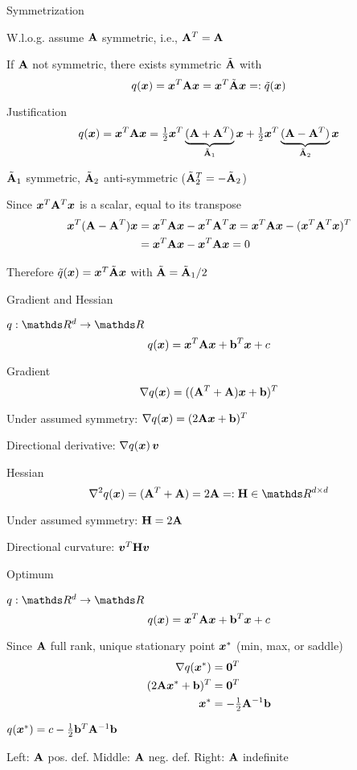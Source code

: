 \documentclass[11pt,compress,t,notes=noshow, xcolor=table]{beamer}
\begin{document}
\begin{framei}{Symmetrization}
\item W.l.o.g. assume $\mathbf{A}$ symmetric, i.e., $\mathbf{A}^T = \mathbf{A}$
\item If $\mathbf{A}$ not symmetric, there exists symmetric $\tilde {\mathbf{A}}$ with $$ q(\bm{x}) = \bm{x}^T \mathbf{A} \bm{x} = \bm{x}^T \tilde {\mathbf{A}} \bm{x} =: \tilde q(\bm{x}) $$
\item Justification
$$ q(\bm{x}) = \bm{x}^T \mathbf{A} \bm{x} = \tfrac12 \bm{x}^T \underbrace{(\mathbf{A} + \mathbf{A}^T)}_{\tilde {\mathbf{A}}_1} \bm{x} + \tfrac12 \bm{x}^T \underbrace{(\mathbf{A} - \mathbf{A}^T)}_{\tilde {\mathbf{A}}_2} \bm{x} $$
\item $\tilde {\mathbf{A}}_1$ symmetric, $\tilde {\mathbf{A}}_2$ anti-symmetric ($\tilde {\mathbf{A}}_2^T = - \tilde {\mathbf{A}}_2$)
\item Since $\bm{x}^T \mathbf{A}^T \bm{x}$ is a scalar, equal to its transpose
\begin{align*}
\bm{x}^T (\mathbf{A} - \mathbf{A}^T) \bm{x} &= \bm{x}^T \mathbf{A} \bm{x} - \bm{x}^T \mathbf{A}^T \bm{x} = \bm{x}^T \mathbf{A} \bm{x} - (\bm{x}^T \mathbf{A}^T \bm{x})^T \\
                      &= \bm{x}^T \mathbf{A} \bm{x} - \bm{x}^T \mathbf{A} \bm{x} = 0
\end{align*}
\item Therefore $\tilde q(\bm{x}) = \bm{x}^T \tilde {\mathbf{A}} \bm{x}$ with $\tilde {\mathbf{A}} = \tilde {\mathbf{A}}_1/2$
\end{framei}

\begin{framei}{Gradient and Hessian}
\item $q: \R^d \to \R$
$$ q(\bm{x}) = \bm{x}^T \mathbf{A} \bm{x} + \mathbf{b}^T \bm{x} + c $$
\item Gradient
$$ \nabla q(\bm{x}) = ((\mathbf{A}^T + \mathbf{A}) \bm{x} + \mathbf{b})^T $$
\item Under assumed symmetry: $\nabla q(\bm{x}) = (2 \mathbf{A} \bm{x} + \mathbf{b})^T$
\item Directional derivative: $\nabla q(\bm{x})\, \bm{v} $
\item Hessian
$$ \nabla^2 q(\xv) = (\A^T + \A) = 2 \A =: \H \in \R^{d \times d} $$
\item Under assumed symmetry: $\mathbf{H} = 2 \mathbf{A}$
\item Directional curvature: $\bm{v}^T \mathbf{H} \bm{v} $
\end{framei}


\begin{framei}{Optimum}
\item $q: \R^d \to \R$
$$ q(\bm{x}) = \bm{x}^T \mathbf{A} \bm{x} + \mathbf{b}^T \bm{x} + c $$
\item Since $\mathbf{A}$ full rank, unique stationary point $\bm{x}^\ast$ (min, max, or saddle)
\begin{align*}
\nabla q(\bm{x}^\ast)      &= \boldsymbol{0}^T \\
(2 \mathbf{A} \bm{x}^\ast + \mathbf{b})^T &= \boldsymbol{0}^T \\
\bm{x}^\ast                &= -\tfrac{1}{2} \mathbf{A}^{-1} \mathbf{b}
\end{align*}
\item $q(\bm{x}^\ast) = c - \frac12 \mathbf{b}^T \mathbf{A}^{-1} \mathbf{b}$
\vfill
{}
\item Left: $\mathbf{A}$ pos. def. \quad Middle: $\mathbf{A}$ neg. def. \quad Right: $\mathbf{A}$ indefinite
\end{framei}
\end{document}
